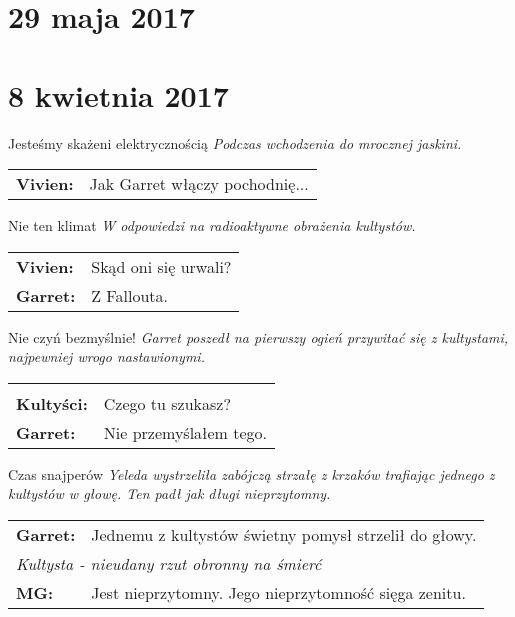 \documentclass[10pt,twoside,twocolumn]{book}
\begin{document}
\section*{29 maja 2017}

\section*{8 kwietnia 2017}


\begin{rpg-quotebox}{Jesteśmy skażeni elektrycznością}
   \textit{Podczas wchodzenia do mrocznej jaskini.}\\
   
   \begin{tabularx}{\columnwidth}{lX}
      \textbf{Vivien:} & Jak Garret włączy pochodnię...\\
   \end{tabularx}
\end{rpg-quotebox}

    
\begin{rpg-quotebox}{Nie ten klimat}
   \textit{W odpowiedzi na radioaktywne obrażenia kultystów.}\\

   \begin{tabularx}{\columnwidth}{lX}
      \textbf{Vivien:} & Skąd oni się urwali?\\
      \textbf{Garret:} & Z Fallouta.\\
   \end{tabularx}
\end{rpg-quotebox}

   
\begin{rpg-quotebox}{Nie czyń bezmyślnie!}
   \textit{Garret poszedł na pierwszy ogień przywitać się z kultystami, najpewniej wrogo nastawionymi.}\\
   
   \begin{tabularx}{\columnwidth}{lX}
      \multicolumn{2}{l}{\textit{}}\\
      
      \textbf{Kultyści:} & Czego tu szukasz?\\
      \textbf{Garret:} & Nie przemyślałem tego.\\
   \end{tabularx}
\end{rpg-quotebox}


\begin{rpg-quotebox}{Czas snajperów}
   \textit{Yeleda wystrzeliła zabójczą strzałę z krzaków trafiając jednego z kultystów w głowę. Ten padł jak długi nieprzytomny.}\\
   
   \begin{tabularx}{\columnwidth}{lX}
      \textbf{Garret:} & Jednemu z kultystów świetny pomysł strzelił do głowy.\\
      \multicolumn{2}{X}{\textit{Kultysta - nieudany rzut obronny na śmierć}}\\
      \textbf{MG:} & Jest nieprzytomny. Jego nieprzytomność sięga zenitu.\\
   \end{tabularx}
\end{rpg-quotebox}
\end{document}
